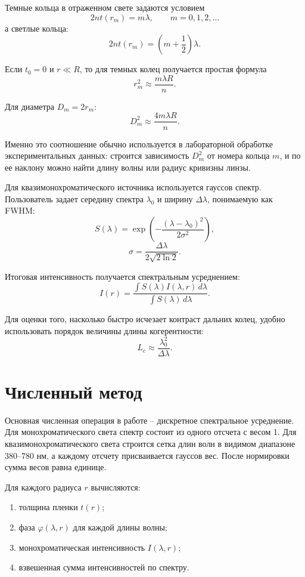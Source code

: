 \documentclass[12pt,a4paper]{article}
\begin{document}
Темные кольца в отраженном свете задаются условием
\[
2nt(r_m)=m\lambda,\qquad m=0,1,2,\ldots
\]
а светлые кольца:
\[
2nt(r_m)=\left(m+\frac{1}{2}\right)\lambda.
\]

Если \(t_0=0\) и \(r\ll R\), то для темных колец получается простая формула
\[
r_m^2\approx \frac{m\lambda R}{n}.
\]

Для диаметра \(D_m=2r_m\):
\[
D_m^2\approx \frac{4m\lambda R}{n}.
\]

Именно это соотношение обычно используется в лабораторной обработке экспериментальных данных:
строится зависимость \(D_m^2\) от номера кольца \(m\), и по ее наклону можно найти длину волны или
радиус кривизны линзы.

Для квазимонохроматического источника используется гауссов спектр. Пользователь задает середину
спектра \(\lambda_0\) и ширину \(\Delta\lambda\), понимаемую как FWHM:
\[
S(\lambda)=\exp\left(-\frac{(\lambda-\lambda_0)^2}{2\sigma^2}\right),
\]
\[
\sigma=\frac{\Delta\lambda}{2\sqrt{2\ln2}}.
\]

Итоговая интенсивность получается спектральным усреднением:
\[
I(r)=
\frac{\int S(\lambda)I(\lambda,r)\,d\lambda}
{\int S(\lambda)\,d\lambda}.
\]

Для оценки того, насколько быстро исчезает контраст дальних колец, удобно использовать порядок
величины длины когерентности:
\[
L_c\approx \frac{\lambda_0^2}{\Delta\lambda}.
\]

\section{Численный метод}

Основная численная операция в работе -- дискретное спектральное усреднение. Для монохроматического
света спектр состоит из одного отсчета с весом 1. Для квазимонохроматического света строится сетка
длин волн в видимом диапазоне \(380\)--\(780\) нм, а каждому отсчету присваивается гауссов вес.
После нормировки сумма весов равна единице.

Для каждого радиуса \(r\) вычисляются:
\begin{enumerate}
  \item толщина пленки \(t(r)\);
  \item фаза \(\varphi(\lambda,r)\) для каждой длины волны;
  \item монохроматическая интенсивность \(I(\lambda,r)\);
  \item взвешенная сумма интенсивностей по спектру.
\end{enumerate}
\end{document}
